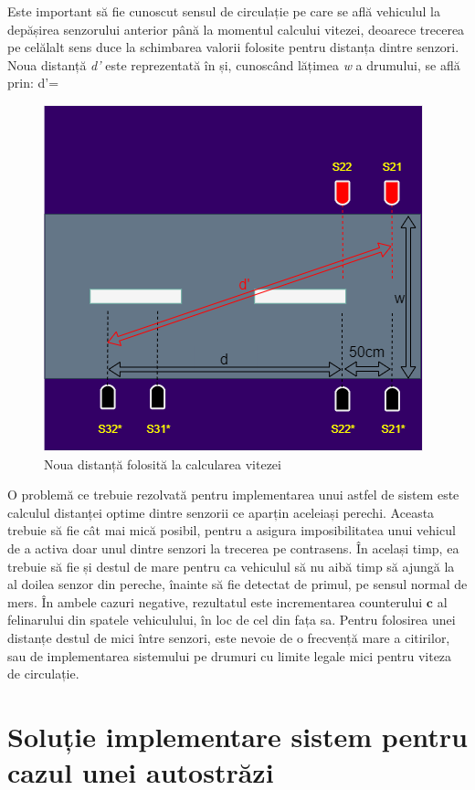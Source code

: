 Este important să fie cunoscut sensul de circulație pe care se află vehiculul la depășirea senzorului anterior până la momentul calcului vitezei, deoarece trecerea pe celălalt sens duce la schimbarea valorii  folosite pentru distanța dintre senzori. Noua distanță \textit{d'} este reprezentată în  și, cunoscând lățimea \textit{w} a drumului, se află prin: 
\be
\label{eq:test}
d'=
\ee
\begin{figure}[!ht]
    \begin{center}
    \includegraphics[width=0.4\linewidth,keepaspectratio]{pics/dist.png}
    \end{center}
    \caption{Noua distanță folosită la calcularea vitezei}
    \label{fig:dist}
\end{figure}

O problemă ce trebuie rezolvată pentru implementarea unui astfel de sistem este calculul distanței optime dintre senzorii ce aparțin aceleiași perechi. Aceasta trebuie să fie cât mai mică posibil, pentru a asigura imposibilitatea unui vehicul de a activa doar unul dintre senzori la trecerea pe contrasens. În același timp, ea trebuie să fie și destul de mare pentru ca vehiculul să nu aibă timp să ajungă la al doilea senzor din pereche, înainte să fie detectat de primul, pe sensul normal de mers. În ambele cazuri negative, rezultatul este incrementarea counterului $\mathbf{c}$ al felinarului din spatele vehiculului, în loc de cel din fața sa. Pentru folosirea unei distanțe destul de mici între senzori, este nevoie de o frecvență mare a citirilor, sau de implementarea sistemului pe drumuri cu limite legale mici pentru viteza de circulație.


\section{Soluție implementare sistem pentru cazul unei autostrăzi} \label{hw}


